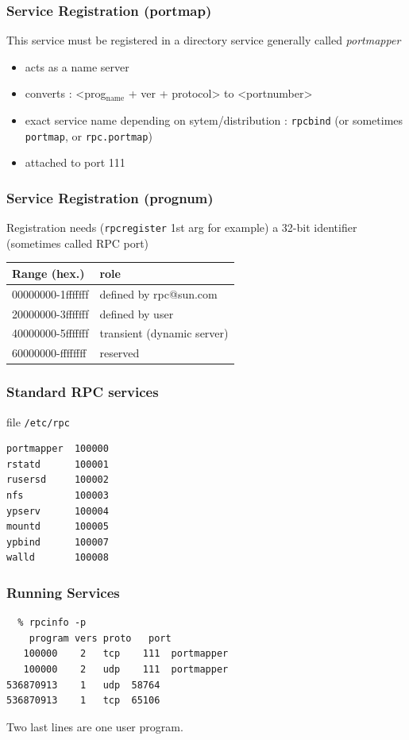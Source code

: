 \documentclass[bigger,hyperref={colorlinks=true, urlcolor=red, plainpages=false, pdfpagelabels, bookmarksnumbered}]{beamer}
\begin{document}
\begin{frame}
\frametitle{Service Registration (portmap)}
\label{sec-2-4}

 This service must be registered in a directory service generally called \emph{portmapper} 
\begin{itemize}
\item acts as a name server
\item converts : <prog$_{\mathrm{name}}$ + ver + protocol> to <portnumber>
\item exact service name depending on sytem/distribution : \texttt{rpcbind} (or sometimes \texttt{portmap}, or \texttt{rpc.portmap})
\item attached to port 111
\end{itemize}
\end{frame}
\begin{frame}
\frametitle{Service Registration (prognum)}
\label{sec-2-5}


Registration needs (\texttt{rpcregister} 1st arg for example)
a 32-bit identifier (sometimes called RPC port) 


\begin{center}
\begin{tabular}{ll}
 Range (hex.)       &  role                        \\
\hline
 00000000-1fffffff  &  defined by rpc@sun.com      \\
 20000000-3fffffff  &  defined by user             \\
 40000000-5fffffff  &  transient (dynamic server)  \\
 60000000-ffffffff  &  reserved                    \\
\end{tabular}
\end{center}
\end{frame}
\begin{frame}[fragile]
\frametitle{Standard RPC services}
\label{sec-2-6}
\begin{block}{file \texttt{/etc/rpc}}
\label{sec-2-6-1}


\lstset{language=C}
\begin{lstlisting}
portmapper  100000  
rstatd      100001  
rusersd     100002  
nfs         100003  
ypserv      100004 
mountd      100005 
ypbind      100007
walld       100008
\end{lstlisting}
     
\end{block}
\end{frame}
\begin{frame}[fragile]
\frametitle{Running Services}
\label{sec-2-7}


\lstset{language=C}
\begin{lstlisting}
  % rpcinfo -p
    program vers proto   port
   100000    2   tcp    111  portmapper
   100000    2   udp    111  portmapper
536870913    1   udp  58764
536870913    1   tcp  65106
\end{lstlisting}
 Two last lines are one user program.


 
\end{frame}
\end{document}
